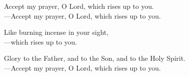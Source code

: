 \responsory

\noindent Accept my prayer, O Lord, which rises up to you.\\
{\color{red}---\thinspace}Accept my prayer, O Lord, which rises up to you.

\medskip\noindent Like burning incense in your sight,\\
{\color{red}---\thinspace}which rises up to you.

\medskip\noindent Glory to the Father, and to the Son, and to the Holy Spirit.\\
{\color{red}---\thinspace}Accept my prayer, O Lord, which rises up to you.